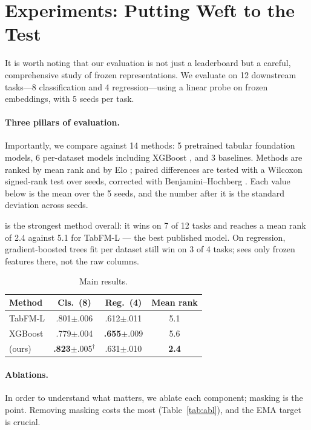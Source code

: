 \section{Experiments: Putting Weft to the Test}\label{sec:exp}

It is worth noting that our evaluation is not just a leaderboard but a careful, comprehensive study of frozen representations. We evaluate on 12 downstream tasks---8 classification and 4 regression---using a linear probe on frozen embeddings, with 5 seeds per task.

\paragraph{Three pillars of evaluation.} Importantly, we compare against 14 methods: 5 pretrained tabular foundation models, 6 per-dataset models including XGBoost \citep{chen2016xgboost}, and 3 baselines. Methods are ranked by mean rank and by Elo \citep{elo1978}; paired differences are tested with a Wilcoxon signed-rank test over seeds, corrected with Benjamini--Hochberg \citep{bh1995}. Each value below is the mean over the 5 seeds, and the number after it is the standard deviation across seeds.

\weft{} is the strongest method overall: it wins on 7 of 12 tasks and reaches a mean rank of 2.4 against 5.1 for TabFM-L --- the best published model. On regression, gradient-boosted trees fit per dataset still win on 3 of 4 tasks; \weft{} sees only frozen features there, not the raw columns.

\begin{table}[t]
\caption{Main results.}\label{tab:main}
\centering\small
\begin{tabular}{lccc}
\toprule
Method & Cls.\ (8) & Reg.\ (4) & Mean rank \\
\midrule
TabFM-L & .801$\pm$.006 & .612$\pm$.011 & 5.1 \\
XGBoost & .779$\pm$.004 & \textbf{.655}$\pm$.009 & 5.6 \\
\weft{} (ours) & \textbf{.823}$\pm$.005$^\dagger$ & .631$\pm$.010 & \textbf{2.4} \\
\bottomrule
\end{tabular}
\end{table}

\paragraph{Ablations.} In order to understand what matters, we ablate each component; masking is the point. Removing masking costs the most (Table~\ref{tab:abl}), and the EMA target is crucial.

